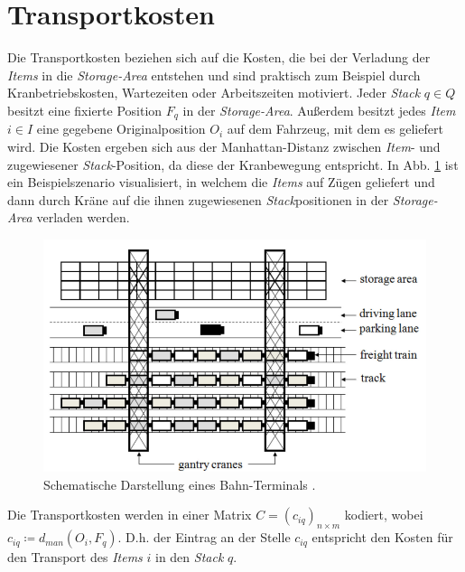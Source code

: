 \section{Transportkosten}
\label{sec:transport_costs}
Die Transportkosten beziehen sich auf die Kosten, die bei der Verladung der \textit{Items} in die \textit{Storage-Area} entstehen
und sind praktisch zum Beispiel durch Kranbetriebskosten, Wartezeiten oder Arbeitszeiten motiviert.\newline
Jeder \textit{Stack} $q \in Q$ besitzt eine fixierte Position $F_q$ in der \textit{Storage-Area}.
Außerdem besitzt jedes \textit{Item} $i \in I$ eine gegebene Originalposition $O_i$ auf dem Fahrzeug, mit dem es geliefert wird.
Die Kosten ergeben sich aus der Manhattan-Distanz zwischen \textit{Item}- und zugewiesener \textit{Stack}-Position, da diese der Kranbewegung entspricht. In Abb. \ref{fig:costs} ist ein Beispielszenario visualisiert, in welchem die \textit{Items} auf Zügen geliefert und dann durch Kräne auf die ihnen zugewiesenen \textit{Stack}positionen in der \textit{Storage-Area} verladen werden.
\begin{figure}[H]
\includegraphics[width=\textwidth]{img/costs.png}
\caption{Schematische Darstellung eines Bahn-Terminals \cite{Briskorn2018}.}
\label{fig:costs}
\end{figure}
Die Transportkosten werden in einer Matrix $C = (c_{iq})_{n \times m}$ kodiert, \newline wobei $c_{iq} \coloneqq d_{man}(O_i, F_q)$.
D.h. der Eintrag an der Stelle $c_{iq}$ entspricht den Kosten für den Transport des \textit{Items} $i$ in den \textit{Stack} $q$.

\pagebreak

